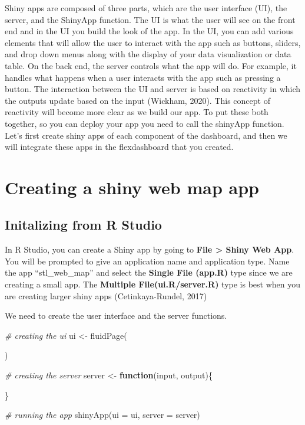 \documentclass[
  krantz2]{krantz}
\makeatletter
\newenvironment{Shaded}{\begin{snugshade}}{\end{snugshade}}
\newcommand{\AttributeTok}[1]{\textcolor[rgb]{0.61,0.61,0.61}{#1}}
\newcommand{\CommentTok}[1]{\textcolor[rgb]{0.37,0.37,0.37}{\textit{#1}}}
\newcommand{\ControlFlowTok}[1]{\textcolor[rgb]{0.27,0.27,0.27}{\textbf{#1}}}
\newcommand{\FunctionTok}[1]{\textcolor[rgb]{0,0,0}{#1}}
\newcommand{\NormalTok}[1]{#1}
\newcommand{\OtherTok}[1]{\textcolor[rgb]{0.37,0.37,0.37}{#1}}
\newenvironment{kframe}{%
\medskip{}
\setlength{\fboxsep}{.8em}
 \def\at@end@of@kframe{}%
 \ifinner\ifhmode%
  \def\at@end@of@kframe{\end{minipage}}%
  \begin{minipage}{\columnwidth}%
 \fi\fi%
 \def\FrameCommand##1{\hskip\@totalleftmargin \hskip-\fboxsep
 \colorbox{shadecolor}{##1}\hskip-\fboxsep
     \hskip-\linewidth \hskip-\@totalleftmargin \hskip\columnwidth}%
 \MakeFramed {\advance\hsize-\width
   \@totalleftmargin\z@ \linewidth\hsize
   \@setminipage}}%
 {\par\unskip\endMakeFramed%
 \at@end@of@kframe}
\renewenvironment{Shaded}{\begin{kframe}}{\end{kframe}}
\makeatother
\begin{document}
Shiny apps are composed of three parts, which are the user interface (UI), the server, and the ShinyApp function. The UI is what the user will see on the front end and in the UI you build the look of the app. In the UI, you can add various elements that will allow the user to interact with the app such as buttons, sliders, and drop down menus along with the display of your data visualization or data table. On the back end, the server controls what the app will do. For example, it handles what happens when a user interacts with the app such as pressing a button. The interaction between the UI and server is based on reactivity in which the outputs update based on the input (Wickham, 2020). This concept of reactivity will become more clear as we build our app. To put these both together, so you can deploy your app you need to call the shinyApp function. Let's first create shiny apps of each component of the dashboard, and then we will integrate these apps in the flexdashboard that you created.

\hypertarget{creating-a-shiny-web-map-app}{%
\section{Creating a shiny web map app}\label{creating-a-shiny-web-map-app}}

\hypertarget{initalizing-from-r-studio}{%
\subsection{Initalizing from R Studio}\label{initalizing-from-r-studio}}

In R Studio, you can create a Shiny app by going to \textbf{File \textgreater{} Shiny Web App}. You will be prompted to give an application name and application type. Name the app ``stl\_web\_map'' and select the \textbf{Single File (app.R)} type since we are creating a small app. The \textbf{Multiple File(ui.R/server.R)} type is best when you are creating larger shiny apps (Cetinkaya-Rundel, 2017)

We need to create the user interface and the server functions.

\begin{Shaded}
\begin{Highlighting}[]
\CommentTok{\# creating the ui}
\NormalTok{ui }\OtherTok{\textless{}{-}} \FunctionTok{fluidPage}\NormalTok{(}

\NormalTok{)}

\CommentTok{\# creating the server}
\NormalTok{server }\OtherTok{\textless{}{-}} \ControlFlowTok{function}\NormalTok{(input, output)\{}

\NormalTok{\}}

\CommentTok{\# running the app}
\FunctionTok{shinyApp}\NormalTok{(}\AttributeTok{ui =}\NormalTok{ ui, }\AttributeTok{server =}\NormalTok{ server)}
\end{Highlighting}
\end{Shaded}
\end{document}
